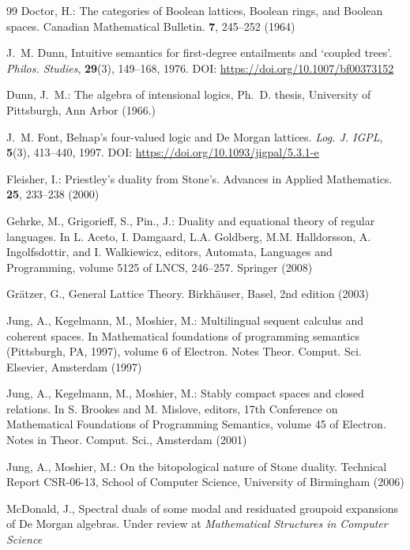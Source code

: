 \documentclass{amsart}
\theoremstyle{plain}
\theoremstyle{definition}
\begin{document}
\begin{thebibliography}{99}
 Doctor, H.: The categories of Boolean lattices, Boolean rings, and Boolean spaces. Canadian Mathematical Bulletin. \textbf{7}, 245--252 (1964)

J.~M. Dunn,
\newblock Intuitive semantics for first-degree entailments and `coupled trees'.
\newblock \emph{Philos. Studies}, \textbf{29}(3), 149--168, 1976.
\newblock DOI: \url{https://doi.org/10.1007/bf00373152}

 Dunn, J.~M.: The algebra of intensional logics, Ph.~D. thesis, University of Pittsburgh,
Ann Arbor (1966.)



J.~M. Font, 
\newblock Belnap's four-valued logic and {D}e {M}organ lattices.
\newblock \emph{Log. J. IGPL}, \textbf{5}(3), 413--440, 1997.
\newblock DOI: \url{https://doi.org/10.1093/jigpal/5.3.1-e}

 Fleisher, I.: Priestley’s duality from Stone’s. Advances in Applied Mathematics. \textbf{25}, 233–238 (2000)

 Gehrke, M., Grigorieff, S., Pin., J.: Duality and equational theory of regular languages. In L. Aceto, I. Damgaard, L.A. Goldberg, M.M. Halldorsson, A. Ingolfsdottir, and I. Walkiewicz, editors, Automata,
Languages and Programming, volume 5125 of LNCS, 246--257. Springer (2008)

 Grätzer, G., General Lattice Theory. Birkhäuser, Basel, 2nd edition (2003)

 Jung, A., Kegelmann, M., Moshier, M.: Multilingual sequent calculus and coherent spaces. In
Mathematical foundations of programming semantics (Pittsburgh, PA, 1997), volume 6 of Electron.
Notes Theor. Comput. Sci. Elsevier, Amsterdam (1997) 


 Jung, A., Kegelmann, M., Moshier, M.: Stably compact spaces and closed relations. In S. Brookes
and M. Mislove, editors, 17th Conference on Mathematical Foundations of Programming Semantics,
volume 45 of Electron. Notes in Theor. Comput. Sci., Amsterdam (2001)

 Jung, A., Moshier, M.: On the bitopological nature of Stone duality. Technical Report CSR-06-13, School of Computer Science, University of Birmingham (2006)

 McDonald, J., Spectral duals of some modal and residuated groupoid expansions of De Morgan algebras. Under review at \emph{Mathematical Structures in Computer Science} 


\end{thebibliography}
\end{document}
